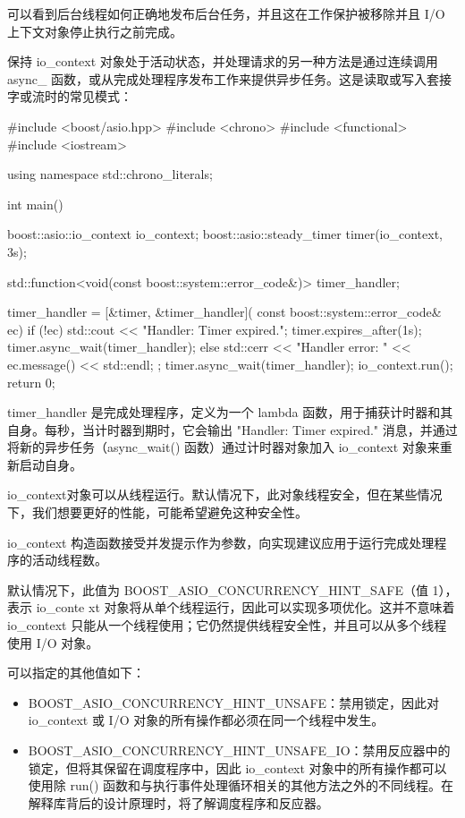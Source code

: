 可以看到后台线程如何正确地发布后台任务，并且这在工作保护被移除并且 I/O 上下文对象停止执行之前完成。

保持 io\_context 对象处于活动状态，并处理请求的另一种方法是通过连续调用 async\_ 函数，或从完成处理程序发布工作来提供异步任务。这是读取或写入套接字或流时的常见模式：

\begin{cpp}
#include <boost/asio.hpp>
#include <chrono>
#include <functional>
#include <iostream>

using namespace std::chrono_literals;

int main() {
    boost::asio::io_context io_context;
    boost::asio::steady_timer timer(io_context, 3s);

    std::function<void(const boost::system::error_code&)>
                    timer_handler;

    timer_handler = [&timer, &timer_handler](
                    const boost::system::error_code& ec) {
        if (!ec) {
            std::cout << "Handler: Timer expired.\n";
            timer.expires_after(1s);
            timer.async_wait(timer_handler);
        } else {
            std::cerr << "Handler error: "
                      << ec.message() << std::endl;
            }
        };
    timer.async_wait(timer_handler);
    io_context.run();
    return 0;
}
\end{cpp}

timer\_handler 是完成处理程序，定义为一个 lambda 函数，用于捕获计时器和其自身。每秒，当计时器到期时，它会输出 "Handler: Timer expired." 消息，并通过将新的异步任务（async\_wait() 函数）通过计时器对象加入 io\_context 对象来重新启动自身。

io\_context对象可以从线程运行。默认情况下，此对象线程安全，但在某些情况下，我们想要更好的性能，可能希望避免这种安全性。


io\_context 构造函数接受并发提示作为参数，向实现建议应用于运行完成处理程序的活动线程数。

默认情况下，此值为 BOOST\_ASIO\_CONCURRENCY\_HINT\_SAFE（值 1），表示 io\_conte xt 对象将从单个线程运行，因此可以实现多项优化。这并不意味着 io\_context 只能从一个线程使用；它仍然提供线程安全性，并且可以从多个线程使用 I/O 对象。

可以指定的其他值如下：

\begin{itemize}
\item
BOOST\_ASIO\_CONCURRENCY\_HINT\_UNSAFE：禁用锁定，因此对 io\_context 或 I/O 对象的所有操作都必须在同一个线程中发生。

\item
BOOST\_ASIO\_CONCURRENCY\_HINT\_UNSAFE\_IO：禁用反应器中的锁定，但将其保留在调度程序中，因此 io\_context 对象中的所有操作都可以使用除 run() 函数和与执行事件处理循环相关的其他方法之外的不同线程。在解释库背后的设计原理时，将了解调度程序和反应器。
\end{itemize}

